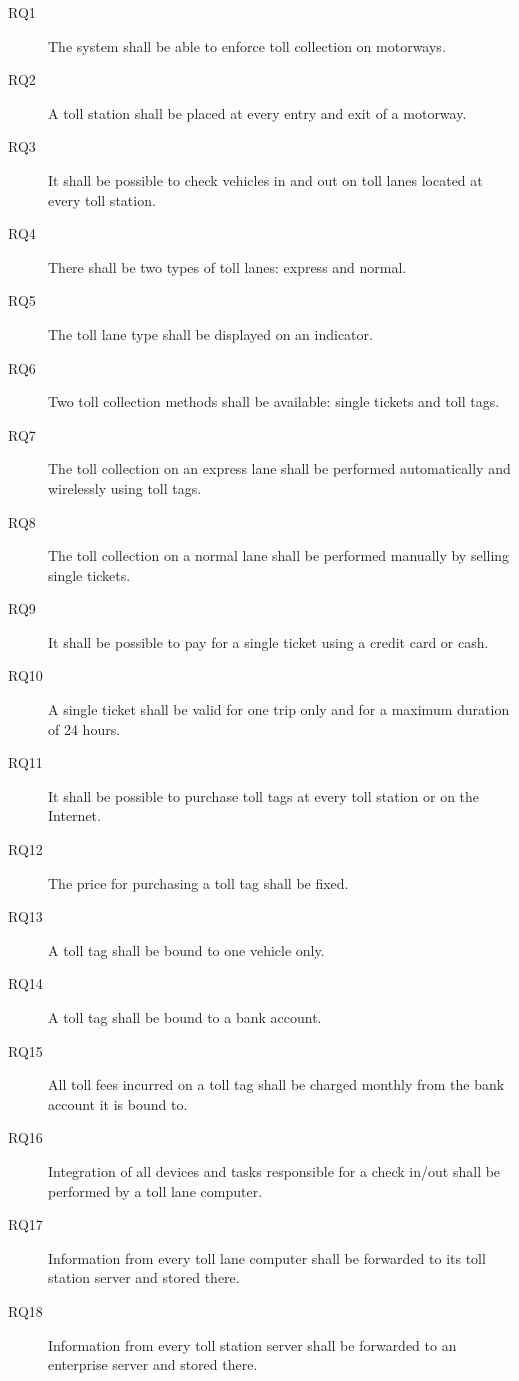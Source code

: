 \begin{description}
  \item[RQ1] The system shall be able to enforce toll collection on motorways.
  \item[RQ2] A toll station shall be placed at every entry and exit of a motorway.
  \item[RQ3] It shall be possible to check vehicles in and out on toll lanes located at every toll station.
  \item[RQ4] There shall be two types of toll lanes: express and normal.
  \item[RQ5] The toll lane type shall be displayed on an indicator.
  \item[RQ6] Two toll collection methods shall be available: single tickets and toll tags.
  \item[RQ7] The toll collection on an express lane shall be performed automatically and wirelessly using toll tags.
  \item[RQ8]The toll collection on a normal lane shall be performed manually by selling single tickets.

  \item[RQ9]It shall be possible to pay for a single ticket using a credit card or cash.
  \item[RQ10]A single ticket shall be valid for one trip only and for a maximum duration of 24 hours.

  \item[RQ11] It shall be possible to purchase toll tags at every toll station or on the Internet.
  \item[RQ12] The price for purchasing a toll tag shall be fixed.
  \item[RQ13] A toll tag shall be bound to one vehicle only.
  \item[RQ14] A toll tag shall be bound to a bank account.
  \item[RQ15] All toll fees incurred on a toll tag shall be charged monthly from the bank account it is bound to.

  \item[RQ16] Integration of all devices and tasks responsible for a check in/out shall be performed by a toll lane computer.
  \item[RQ17] Information from every toll lane computer shall be forwarded to its toll station server and stored there.
  \item[RQ18] Information from every toll station server shall be forwarded to an enterprise server and stored there.


\end{description}

